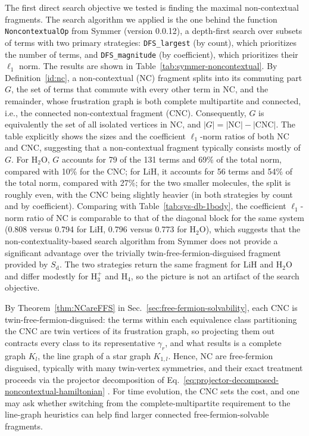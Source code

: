 \documentclass[%
 aip,
 amsmath,amssymb,
 reprint,%
]{revtex4-1}
\newcommand{\pool}{S}                    %
\newcommand{\subdiag}{\mathrm{d}}        %
\newcommand{\pooldiag}{\pool_{\subdiag}} %
\begin{document}
The first direct search objective we tested is finding the maximal non-contextual fragments. The search algorithm we applied is the one behind the function \texttt{NoncontextualOp} from Symmer (version 0.0.12), a depth-first search over subsets of terms with two primary strategies: \texttt{DFS\_largest} (by count), which prioritizes the number of terms, and \texttt{DFS\_magnitude} (by coefficient), which prioritizes their $\ell_1$ norm. The results are shown in Table~\ref{tab:symmer-noncontextual}. By {Definition}~\ref{id:nc}, a non-contextual (NC) fragment splits into its commuting part $G$, the set of terms that commute with every other term in NC, and the remainder, whose frustration graph is both complete multipartite and connected, i.e., the connected non-contextual fragment (CNC). Consequently, $G$ is equivalently the set of all isolated vertices in NC, and $|G|=|\mathrm{NC}|-|\mathrm{CNC}|$. The table explicitly shows the sizes and the coefficient $\ell_1$-norm ratios of both NC and CNC, suggesting that a non-contextual fragment typically consists mostly of $G$. For H$_2$O, $G$ accounts for 79 of the 131 terms and 69\% of the total norm, compared with 10\% for the CNC; for LiH, it accounts for 56 terms and 54\% of the total norm, compared with 27\%; for the two smaller molecules, the split is roughly even, with the CNC being slightly heavier (in both strategies by count and by coefficient). Comparing with Table~\ref{tab:sys-db-1body}, the coefficient $\ell_1$-norm ratio of NC is comparable to that of the diagonal block for the same system (0.808 versus 0.794 for LiH, 0.796 versus 0.773 for H$_2$O), which suggests that the non-contextuality-based search algorithm from Symmer does not provide a significant advantage over the trivially twin-free-fermion-disguised fragment provided by $\pooldiag$. The two strategies return the same fragment for LiH and H$_2$O and differ modestly for H$_3^+$ and H$_4$, so the picture is not an artifact of the search objective.

By Theorem~\ref{thm:NCareFFS} in Sec.~\ref{sec:free-fermion-solvability}, each CNC is twin-free-fermion-disguised: the terms within each equivalence class partitioning the CNC are twin vertices of its frustration graph, so projecting them out contracts every class to its representative $\gamma_r$, and what results is a complete graph $K_l$, the line graph of a star graph $K_{1,l}$. Hence, NC are free-fermion disguised, typically with many twin-vertex symmetries, and their exact treatment proceeds via the projector decomposition of Eq.~\eqref{eq:projector-decomposed-noncontextual-hamiltonian}
. 
For time evolution, the CNC sets the cost, and one may ask whether switching from the complete-multipartite requirement to the line-graph heuristics can help find larger connected free-fermion-solvable fragments.
\end{document}

